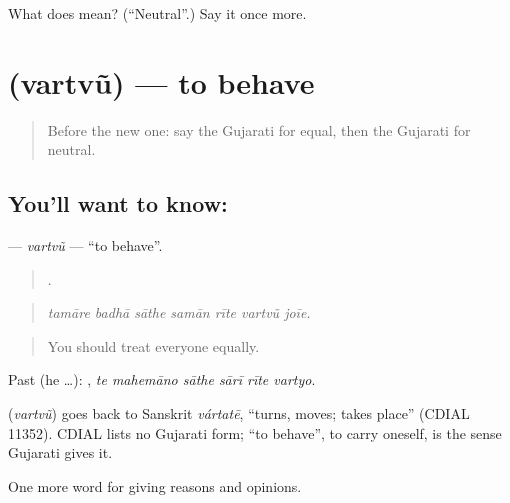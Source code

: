 \begin{tcolorbox}[breakable,colback=teal!4,colframe=teal!35!black,title={Before you move on}]
What does  mean? (\textquotedblleft{}Neutral\textquotedblright{}.) Say it once more.
\end{tcolorbox}
\section[\texorpdfstring{\gu{વર્તવું} (vartvũ)}{વર્તવું (vartvũ)}]{ (vartvũ) — to behave}

\label{lesson:GU-C349-vartvu}



\begin{quote}
Before the new one: say the Gujarati for equal, then the Gujarati for neutral.
\end{quote}

\subsection*{You'll want to know: }
\textbf{} — \emph{vartvũ} — \textquotedblleft{}to behave\textquotedblright{}.

\begin{quote}
      .
\end{quote}

\begin{quote}
\emph{tamāre badhā sāthe samān rīte vartvũ joīe.}
\end{quote}

\begin{quote}
You should treat everyone equally.
\end{quote}

Past (he …):      , \emph{te mahemāno sāthe sārī rīte vartyo}.

\begin{cousinweb}
\textbf{} (\emph{vartvũ}) goes back to Sanskrit \emph{vártatē}, \textquotedblleft{}turns, moves; takes place\textquotedblright{} (CDIAL 11352). CDIAL lists no Gujarati form; \textquotedblleft{}to behave\textquotedblright{}, to carry oneself, is the sense Gujarati gives it.
\end{cousinweb}

\begin{grammarlens}[title={What you've built}]
One more word for giving reasons and opinions.
\end{grammarlens}

